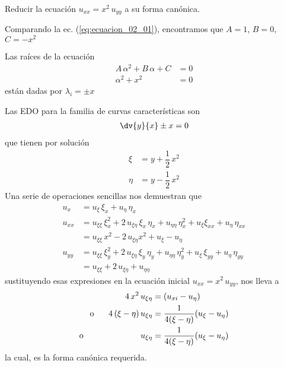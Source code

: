 \begin{ejemplo}\label{ejemplo_02_01}{Reducir la ecuación $u_{xx} = x^{2} \, u_{yy}$ a su forma canónica.}

Comparando la ec. (\ref{eq:ecuacion_02_01}), encontramos que $A = 1$, $B = 0$, $C = -x^{2}$
\par
Las raíces de la ecuación
\begin{align*}
A \, \alpha^{2} + B \, \alpha + C &= 0 \\
\alpha^{2} + x^{2} &= 0
\end{align*}
están dadas por $\lambda_{i} = \pm x$
\par
Las EDO para la familia de curvas características son
\begin{align*}
\dv{y}{x} \pm x = 0
\end{align*}
que tienen por solución
\begin{align*}
\xi &= y + \dfrac{1}{2} \, x^{2} \\[1em]
\eta &= y - \dfrac{1}{2} \, x^{2}
\end{align*}
Una serie de operaciones sencillas nos demuestran que
\begin{align*}
u_{x} &= u_{\xi} \, \xi_{x} + u_{\eta} \, \eta_{x} \\
u_{xx} &= u_{\xi \xi} \, \xi_{x}^{2} + 2 \, u_{\xi \eta} \, \xi_{x} \, \eta_{x} + u_{\eta \eta} \, \eta_{x}^{2} + u_{\xi} \xi_{x x} + u_{\eta} \, \eta_{xx} \\
&= u_{\xi \xi} \, x^{2} - 2 \, u_{\xi \eta} x^{2} + u_{\xi} - u_{\eta} \\
u_{yy} &= u_{\xi \xi} \, \xi_{y}^{2} + 2 \, u_{\xi \eta} \, \xi_{y} \, \eta_{y} + u_{\eta \eta} \, \eta_{y}^{2} + u_{\xi} \, \xi_{y y} + u_{\eta} \, \eta_{yy} \\
&= u_{\xi \xi} + 2 \, u_{\xi \eta} + u_{\eta \eta}
\end{align*}
sustituyendo esas expresiones en la ecuación inicial $u_{x x } = x^{2} \, u_{y y}$, nos lleva a
\begin{align*}
4 \, x^{2} \, u_{\xi \eta} &= (u_{xi} - u_{\eta}) \\
\mbox{o } \hspace{0.5cm} 4 \, (\xi - \eta) \, u_{\xi \eta} &= \dfrac{1}{4 (\xi - \eta)} (u_{\xi} - u_{\eta}) \\
\mbox{o } \hspace{2.3cm} u_{\xi \eta} &= \dfrac{1}{4 (\xi - \eta)} (u_{\xi} - u_{\eta})
\end{align*}
la cual, es la forma canónica requerida.
\end{ejemplo}
